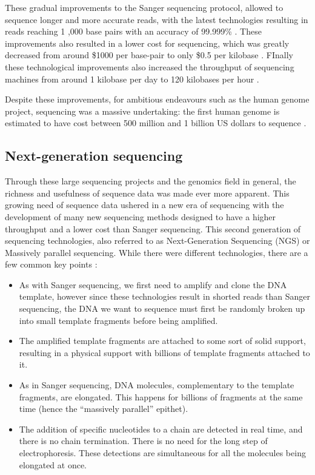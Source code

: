 \documentclass[
  11pt,
  twoside,
  BCOR=10mm,
  listof=totoc]{scrbook}
\begin{document}
These gradual improvements to the Sanger sequencing protocol, allowed to sequence longer and more accurate reads, with the latest technologies resulting in reads reaching 1 ,000 base pairs with an accuracy of 99.999\% \autocite{shendureNextgenerationDNASequencing2008}. These improvements also resulted in a lower cost for sequencing, which was greatly decreased from around \$1000 per base-pair \autocite{collinsHumanGenomeProject2003} to only \$0.5 per kilobase \autocite{shendureNextgenerationDNASequencing2008}. FInally these technological improvements also increased the throughput of sequencing machines from around 1 kilobase per day \autocite{collinsHumanGenomeProject2003} to 120 kilobases per hour \autocite{liuComparisonNextGenerationSequencing2012}.

Despite these improvements, for ambitious endeavours such as the human genome project, sequencing was a massive undertaking: the first human genome is estimated to have cost between 500 million and 1 billion US dollars to sequence \autocite{CostSequencingHuman}.

\hypertarget{next-generation-sequencing}{%
\subsection{Next-generation sequencing}\label{next-generation-sequencing}}

Through these large sequencing projects and the genomics field in general, the richness and usefulness of sequence data was made ever more apparent. This growing need of sequence data ushered in a new era of sequencing with the development of many new sequencing methods designed to have a higher throughput and a lower cost than Sanger sequencing. This second generation of sequencing technologies, also referred to as Next-Generation Sequencing (NGS) or Massively parallel sequencing. While there were different technologies, there are a few common key points \autocite{metzkerSequencingTechnologiesNext2010}:

\begin{itemize}
\item
  As with Sanger sequencing, we first need to amplify and clone the DNA template, however since these technologies result in shorted reads than Sanger sequencing, the DNA we want to sequence must first be randomly broken up into small template fragments before being amplified.
\item
  The amplified template fragments are attached to some sort of solid support, resulting in a physical support with billions of template fragments attached to it.
\item
  As in Sanger sequencing, DNA molecules, complementary to the template fragments, are elongated. This happens for billions of fragments at the same time (hence the ``massively parallel'' epithet).
\item
  The addition of specific nucleotides to a chain are detected in real time, and there is no chain termination. There is no need for the long step of electrophoresis. These detections are simultaneous for all the molecules being elongated at once.
\end{itemize}
\end{document}
